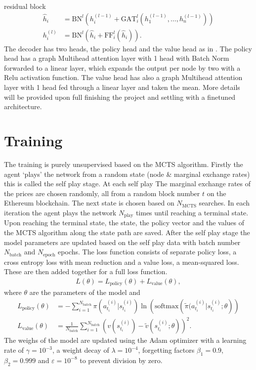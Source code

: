 residual block
\begin{align}
    \hat{h}_{i} &= \text{BN}^{l}\left( h_i^{(l-1)}
    + \text{GAT}_i^{l}(h_1^{(l-1)},\ldots,h_n^{(l-1)})\right)\\
    h_i^{(l)} &= \text{BN}^{l}\left( \hat{h}_{i} + \text{FF}_i^{l}(\hat{h}_i) \right).
\end{align}
The decoder has two heads, the policy head and the value head as in
\cite{alphazero}. The policy head has a graph Multihead attention layer with
1 head with Batch Norm forwarded to a linear layer, which expands the output
per node by two with a Relu activation function. The value head has also a
graph Multihead attention layer with 1 head fed through a linear layer and
taken the mean. More details will be provided upon full finishing the project
and settling with a finetuned architecture.
\section{Training}
The training is purely unsupervised based on the MCTS algorithm. Firstly the
agent `plays' the network from a random state (node \& marginal exchange
rates) this is called the self play stage. At each self play The marginal
exchange rates of the prices are chosen randomly, all from a random block
number $t$ on the Ethereum blockchain. The next state is chosen based on
$N_{\text{MCTS}}$ searches. In each iteration the agent plays the network
$N_{\text{play} }$ times until reaching a terminal state. Upon reaching the
terminal state, the state, the policy vector and the values of the MCTS
algorithm along the state path are saved. After the self play stage the model
parameters are updated based on the self play data with batch number
$N_{\text{batch} }$ and $N_{\text{epoch} }$ epochs. The loss function
consists of separate policy loss, a cross entropy loss with mean
reduction and a value loss, a mean-squared loss. These are then added
together for a full loss function.
\begin{align}
    L(\theta) = L_{\text{policy}}(\theta) + L_{\text{value}}(\theta),
\end{align}
where $\theta$ are the parameters of the model and
\begin{align}
    L_{\text{policy}} (\theta) &= - \sum_{i=1}^{N_{\text{batch}}}
    \pi(a^{(i)}_{t_i} |s ^{(i)}_{t_i})
    \ln \left(\text{softmax}\left(\tilde{\pi}(a^{(i)}_{t_i}|s^{(i)}_{t_i};
        \theta\right)\right) \\
    L_{\text{value}} (\theta) &= \frac{1}{N_{\text{batch}}}
    \sum_{i=1}^{N_{\text{batch}}}
    \left( v(s^{(i)}_{t_i}) - \tilde{v}(s^{(i)}_{t_i}; \theta)  \right)^{2}.
\end{align}
The weighs of the model are updated using the Adam optimizer \cite{adam} with
a learning rate of $\gamma = 10^{-3} $, a weight decay of $\lambda =
10^{-4}$, forgetting factors $\beta_1 = 0.9$, $\beta_2 = 0.999$ and
$\varepsilon = 10^{-8}$ to prevent division by zero.
\newline

